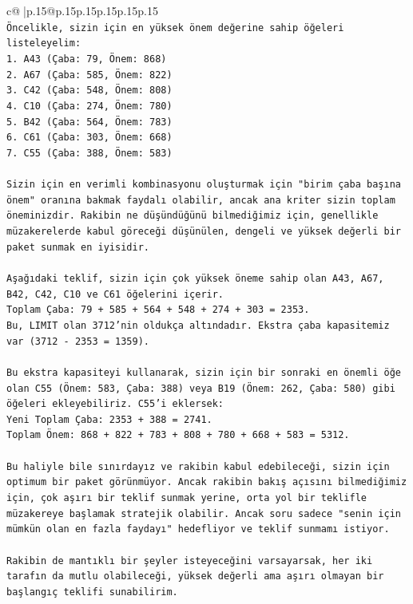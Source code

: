 \documentclass{article}
\begin{document}
{\begin{supertabular}{c@{$\;$}|p{.15\linewidth}@{}p{.15\linewidth}p{.15\linewidth}p{.15\linewidth}p{.15\linewidth}p{.15\linewidth}}
{{{\\ 
\texttt{Öncelikle, sizin için en yüksek önem değerine sahip öğeleri listeleyelim:} \\
\texttt{1. A43 (Çaba: 79, Önem: 868)} \\
\texttt{2. A67 (Çaba: 585, Önem: 822)} \\
\texttt{3. C42 (Çaba: 548, Önem: 808)} \\
\texttt{4. C10 (Çaba: 274, Önem: 780)} \\
\texttt{5. B42 (Çaba: 564, Önem: 783)} \\
\texttt{6. C61 (Çaba: 303, Önem: 668)} \\
\texttt{7. C55 (Çaba: 388, Önem: 583)} \\
\\ 
\texttt{Sizin için en verimli kombinasyonu oluşturmak için "birim çaba başına önem" oranına bakmak faydalı olabilir, ancak ana kriter sizin toplam öneminizdir. Rakibin ne düşündüğünü bilmediğimiz için, genellikle müzakerelerde kabul göreceği düşünülen, dengeli ve yüksek değerli bir paket sunmak en iyisidir.} \\
\\ 
\texttt{Aşağıdaki teklif, sizin için çok yüksek öneme sahip olan A43, A67, B42, C42, C10 ve C61 öğelerini içerir.} \\
\texttt{Toplam Çaba: 79 + 585 + 564 + 548 + 274 + 303 = 2353.} \\
\texttt{Bu, LIMIT olan 3712'nin oldukça altındadır. Ekstra çaba kapasitemiz var (3712 {-} 2353 = 1359).} \\
\\ 
\texttt{Bu ekstra kapasiteyi kullanarak, sizin için bir sonraki en önemli öğe olan C55 (Önem: 583, Çaba: 388) veya B19 (Önem: 262, Çaba: 580) gibi öğeleri ekleyebiliriz. C55'i eklersek:} \\
\texttt{Yeni Toplam Çaba: 2353 + 388 = 2741.} \\
\texttt{Toplam Önem: 868 + 822 + 783 + 808 + 780 + 668 + 583 = 5312.} \\
\\ 
\texttt{Bu haliyle bile sınırdayız ve rakibin kabul edebileceği, sizin için optimum bir paket görünmüyor. Ancak rakibin bakış açısını bilmediğimiz için, çok aşırı bir teklif sunmak yerine, orta yol bir teklifle müzakereye başlamak stratejik olabilir. Ancak soru sadece "senin için mümkün olan en fazla faydayı" hedefliyor ve teklif sunmamı istiyor.} \\
\\ 
\texttt{Rakibin de mantıklı bir şeyler isteyeceğini varsayarsak, her iki tarafın da mutlu olabileceği, yüksek değerli ama aşırı olmayan bir başlangıç teklifi sunabilirim.} \\
}}}
\end{supertabular}}
\end{document}
